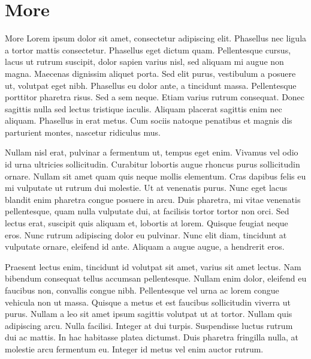 \section{More}
More Lorem ipsum dolor sit amet, consectetur adipiscing elit. Phasellus nec ligula a tortor mattis
consectetur. Phasellus eget dictum quam. Pellentesque cursus, lacus ut rutrum suscipit, dolor sapien varius nisl, sed
aliquam mi augue non magna. Maecenas dignissim aliquet porta. Sed elit purus, vestibulum a posuere ut, volutpat eget
nibh. Phasellus eu dolor ante, a tincidunt massa. Pellentesque porttitor pharetra risus. Sed a sem neque. Etiam varius
rutrum consequat. Donec sagittis nulla sed lectus tristique iaculis. Aliquam placerat sagittis enim nec
aliquam. Phasellus in erat metus. Cum sociis natoque penatibus et magnis dis parturient montes, nascetur ridiculus mus.

Nullam nisl erat, pulvinar a fermentum ut, tempus eget enim. Vivamus vel odio id urna ultricies sollicitudin. Curabitur
lobortis augue rhoncus purus sollicitudin ornare. Nullam sit amet quam quis neque mollis elementum. Cras dapibus felis
eu mi vulputate ut rutrum dui molestie. Ut at venenatis purus. Nunc eget lacus blandit enim pharetra congue posuere in
arcu. Duis pharetra, mi vitae venenatis pellentesque, quam nulla vulputate dui, at facilisis tortor tortor non orci. Sed
lectus erat, suscipit quis aliquam et, lobortis at lorem. Quisque feugiat neque eros. Nunc rutrum adipiscing dolor eu
pulvinar. Nunc elit diam, tincidunt at vulputate ornare, eleifend id ante. Aliquam a augue augue, a hendrerit eros.

Praesent lectus enim, tincidunt id volutpat sit amet, varius sit amet lectus. Nam bibendum consequat tellus accumsan
pellentesque. Nullam enim dolor, eleifend eu faucibus non, convallis congue nibh. Pellentesque vel urna ac lorem congue
vehicula non ut massa. Quisque a metus et est faucibus sollicitudin viverra ut purus. Nullam a leo sit amet ipsum
sagittis volutpat ut at tortor. Nullam quis adipiscing arcu. Nulla facilisi. Integer at dui turpis. Suspendisse luctus
rutrum dui ac mattis. In hac habitasse platea dictumst. Duis pharetra fringilla nulla, at molestie arcu fermentum
eu. Integer id metus vel enim auctor rutrum.

